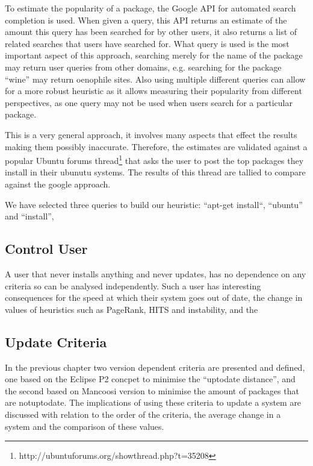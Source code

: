 To estimate the popularity of a package, the Google API for automated search completion is used.
When given a query, this API returns an estimate of the amount this query has been searched for by other users,
it also returns a list of related searches that users have searched for.
What query is used is the most important aspect of this approach,
searching merely for the name of the package may return user queries from other domains, e.g. searching for the package ``wine'' may return oenophile sites.
Also using multiple different queries can allow for a more robust heuristic as it allows measuring their popularity from different perspectives,
as one query may not be used when users search for a particular package.

This is a very general approach, it involves many aspects that effect the results making them possibly inaccurate.
Therefore, the estimates are validated against a popular Ubuntu forums thread\footnote{http://ubuntuforums.org/showthread.php?t=35208} 
that asks the user to post the top packages they install in their ubunutu systems. 
The results of this thread are tallied to compare against the google approach.

We have selected three queries to build our heuristic:
``apt-get install``, ``ubuntu'' and ``install'', 



\subsection{Control User}
{}A user that never installs anything and never updates, has no dependence on any criteria so can be analysed independently.
{}Such a user has interesting consequences for the speed at which their system goes out of date, the change in values of heuristics such as PageRank, HITS and instability,
{}and the 

\subsection{Update Criteria}
{}In the previous chapter two version dependent criteria are presented and defined, one based on the Eclipse P2 concpet to minimise the ``uptodate distance'', 
{}and the second based on Mancoosi version to minimise the amount of packages that are notuptodate. 
{}The implications of using these criteria to update a system are discussed with relation to the order of the criteria, the average change in a system and the comparison of these values.

